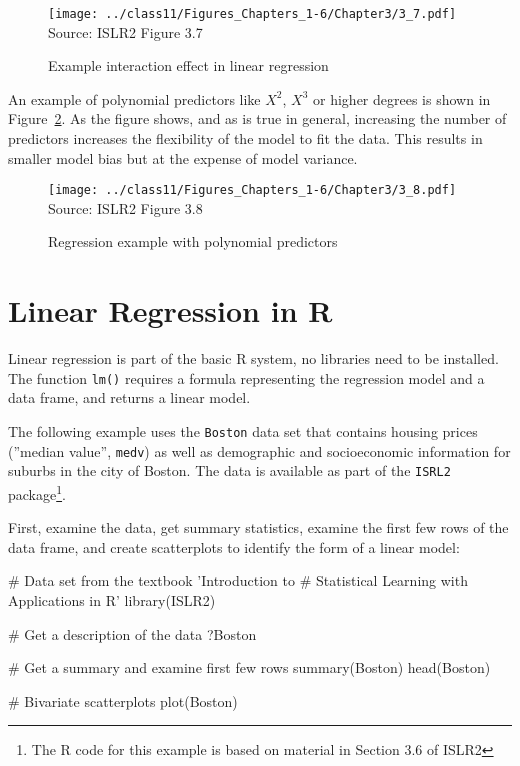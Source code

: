 \begin{figure}
\centering
\texttt{[image: ../class11/Figures\_Chapters\_1-6/Chapter3/3\_7.pdf]} \\

\scriptsize Source: ISLR2 Figure 3.7
\caption{Example interaction effect in linear regression}
\label{fig:groupinteraction}
\end{figure}

An example of polynomial predictors like $X^2$, $X^3$ or higher degrees is shown in Figure~\ref{fig:polynomial_chap12}. As the figure shows, and as is true in general, increasing the number of predictors increases the flexibility of the model to fit the data. This results in smaller model bias but at the expense of model variance. 

\begin{figure}
\centering

\texttt{[image: ../class11/Figures\_Chapters\_1-6/Chapter3/3\_8.pdf]} \\

\scriptsize Source: ISLR2 Figure 3.8
\caption{Regression example with polynomial predictors}
\label{fig:polynomial_chap12}
\end{figure}


\FloatBarrier
\section{Linear Regression in R}

Linear regression is part of the basic R system, no libraries need to be installed. The function \texttt{lm()} requires a formula representing the regression model and a data frame, and returns a linear model. 

The following example uses the \texttt{Boston} data set that contains housing prices (''median value'', \texttt{medv}) as well as demographic and socioeconomic information for suburbs in the city of Boston. The data is available as part of the \texttt{ISRL2} package\footnote{The R code for this example is based on material in Section 3.6 of ISLR2}.

First, examine the data, get summary statistics, examine the first few rows of the data frame, and create scatterplots to identify the form of a linear model:

\begin{samepage}
\begin{Rcode}
# Data set from the textbook 'Introduction to 
# Statistical Learning with Applications in R'
library(ISLR2)

# Get a description of the data
?Boston

# Get a summary and examine first few rows
summary(Boston)
head(Boston)

# Bivariate scatterplots
plot(Boston)
\end{Rcode}
\end{samepage}

